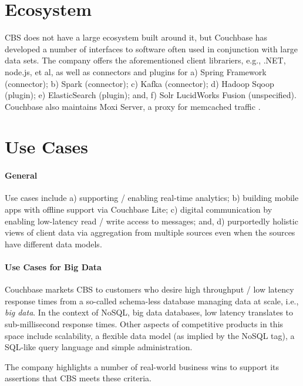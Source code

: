 \documentclass[9pt,twocolumn,twoside]{styles/osajnl}
\begin{document}
\section{Ecosystem} CBS does not have a large ecosystem built around it, but Couchbase has developed a number of interfaces to software often used in conjunction with large data sets.  The company offers the aforementioned client librariers, e.g., .NET, node.js, et al, as well as connectors and plugins for a) Spring Framework (connector); b) Spark (connector); c) Kafka (connector); d) Hadoop Sqoop (plugin); e) ElasticSearch (plugin); and, f) Solr LucidWorks Fusion (unspecified).  Couchbase also maintains Moxi Server, a proxy for memcached traffic \cite{www-downloads-cbsinc}.

\section{Use Cases}
\paragraph{General}
Use cases include a) supporting / enabling real-time analytics; b) building mobile apps with offline support via Couchbase Lite; c) digital communication by enabling low-latency read / write access to messages; and, d) purportedly holistic views of client data via aggregation from multiple sources even when the sources have different data models.

\paragraph{Use Cases for Big Data} Couchbase markets CBS to customers who desire high throughput / low latency response times from a so-called schema-less database managing data at scale, i.e., \textit{big data}. In the context of NoSQL, big data databases, low latency translates to sub-millisecond response times.  Other aspects of competitive products in this space include scalability, a flexible data model (as implied by the NoSQL tag), a SQL-like query language and simple administration.\cite{www-cbsintro-cbsinc}

The company highlights a number of real-world business wins to support its assertions that CBS meets these criteria.
\end{document}
